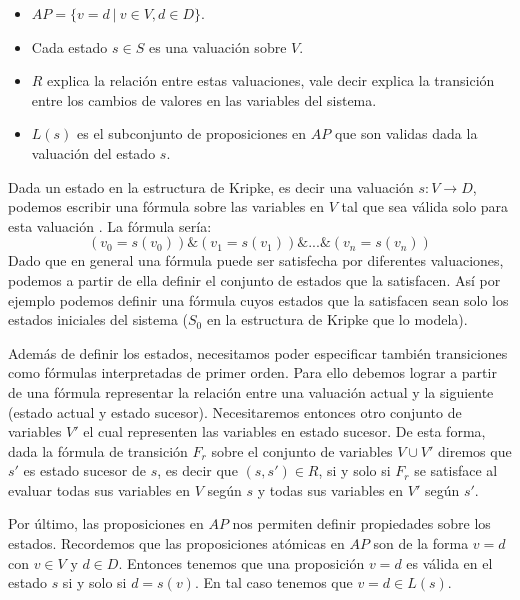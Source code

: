 \documentclass[titlepage, 12pt]{book}
\begin{document}
\begin{itemize}
\item $AP = \{v=d~|~ v \in V, d \in D\}.$
\item Cada estado $s \in S$ es una valuaci\'on sobre $V$.
\item $R$ explica la relaci\'on entre estas valuaciones, vale decir explica la transici\'on entre los cambios de valores en las variables del sistema.
\item $L(s)$ es el subconjunto de proposiciones en $AP$ que son validas dada la valuaci\'on del estado $s$.
\end{itemize}

Dada un estado en la estructura de Kripke, es decir una valuaci\'on $s:V\rightarrow D$, podemos escribir una f\'ormula sobre las variables en $V$ tal que sea v\'alida solo para esta valuaci\'on \cite{Clarke}. La f\'ormula ser\'ia: $$(v_0 = s(v_0)) \& (v_1 = s(v_1)) \& ... \& (v_n = s(v_n))$$
Dado que en general una f\'ormula puede ser satisfecha por diferentes valuaciones, podemos a partir de ella definir el conjunto de estados que la satisfacen. As\'i por ejemplo podemos definir una f\'ormula cuyos estados que la satisfacen sean solo los estados iniciales del sistema ($S_0$ en la estructura de Kripke que lo modela).

Adem\'as de definir los estados, necesitamos poder especificar tambi\'en transiciones como f\'ormulas interpretadas de primer orden. Para ello debemos lograr a partir de una f\'ormula representar la relaci\'on entre una valuaci\'on actual y la siguiente (estado actual y estado sucesor). Necesitaremos entonces otro conjunto de variables $V'$ el cual representen las variables en estado sucesor. De esta forma, dada la f\'ormula de transici\'on $F_r$ sobre el conjunto de variables $V \cup V'$ diremos que $s'$ es estado sucesor de $s$, es decir que $(s,s')\in R$, si y solo si $F_r$ se satisface al evaluar todas sus variables en $V$ seg\'un $s$ y todas sus variables en $V'$ seg\'un $s'$.

Por \'ultimo, las proposiciones en $AP$ nos permiten definir propiedades sobre los estados. Recordemos que las proposiciones at\'omicas en $AP$ son de la forma $v=d$ con $v \in V$ y $d \in D$. Entonces tenemos que una proposici\'on $v=d$ es v\'alida en el estado $s$ si y solo si $d = s(v)$. En tal caso tenemos que $v=d \in L(s)$.




\end{document}
